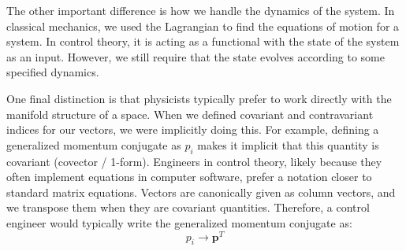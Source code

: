 The other important difference is how we handle the dynamics of the system. In classical mechanics, we used the \gls{Lagrangian} to find the equations of motion for a system. In control theory, it is acting as a functional with the state of the system as an input. However, we still require that the state evolves according to some specified dynamics.

One final distinction is that physicists typically prefer to work directly with the manifold structure of a space. When we defined covariant and contravariant indices for our vectors, we were implicitly doing this. For example, defining a generalized momentum conjugate as $p_i$ makes it implicit that this quantity is covariant (covector / 1-form). Engineers in control theory, likely because they often implement equations in computer software, prefer a notation closer to standard matrix equations. Vectors are canonically given as column vectors, and we transpose them when they are covariant quantities. Therefore, a control engineer would typically write the generalized momentum conjugate as:
$$p_i\rightarrow\bm{p}^T$$
